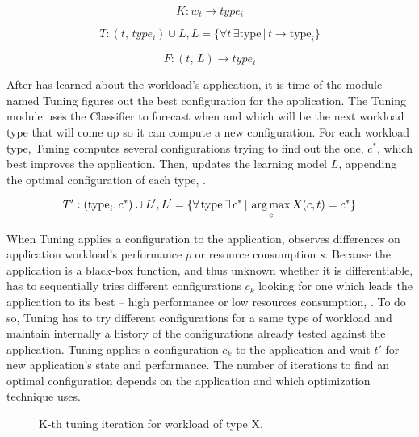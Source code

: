 \begin{equation}
  K: w_t \rightarrow type_i
  \label{eq:classify}
\end{equation}

\begin{equation}
  T: (t,\, type_i) \cup L, L = \{ \forall t\,\exists \text{type}\, |\, t \rightarrow \text{type}_i \}
  \label{eq:training}
\end{equation}

\begin{equation}
  F: (t, \, L) \rightarrow type_i
  \label{eq:forecast}
\end{equation}

After \name has learned about the workload's application, it is time of the module named Tuning figures out the best
configuration for the application. The Tuning module uses the Classifier to forecast when and which will be the next
workload type that will come up so it can compute a new configuration. For each workload type, Tuning computes several
configurations trying to find out the one, $c^{*}$, which best improves the application. Then, \name updates the
learning model $L$, appending the optimal configuration of each type, .

\begin{equation}
  T': (\text{type}_i, c^{*} )\cup L', L' = \{ \forall\, \text{type}\, \exists\, c^{*}\, |\, \operatorname*{arg\,max}_c X(c,t) = c^{*}\}
  \label{eq:training-updated}
\end{equation}

When Tuning applies a configuration to the application, \name observes differences on application workload's
performance $p$ or resource consumption $s$. Because the application is a black-box function, and thus unknown whether
it is differentiable, \name has to sequentially tries different configurations $c_k$ looking for one which leads the
application to its best -- high performance or low resources consumption, . To do so, Tuning
has to try different configurations for a same type of workload and maintain internally a history of the configurations
already tested against the application.  Tuning applies a configuration $c_k$ to the application and wait $t'$ for new
application's state and performance. The number of iterations to find an optimal configuration depends on the
application and which optimization technique \name uses.

\begin{figure*}[htp]
    \centering
    \def\svgwidth{\textwidth}
    \scalebox{1.0}{}
    \caption{K-th tuning iteration for workload of type X.}
    \label{fig:tuning-overview}
\end{figure*}


